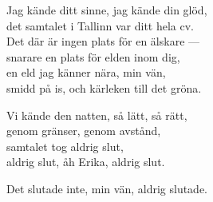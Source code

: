 \begin{lyrics}
Jag kände ditt sinne, jag kände din glöd,\\
det samtalet i Tallinn var ditt hela cv.\\
Det där är ingen plats för en älskare —\\
snarare en plats för elden inom dig,\\
en eld jag känner nära, min vän,\\
smidd på is, och kärleken till det gröna.

Vi kände den natten, så lätt, så rätt,\\
genom gränser, genom avstånd,\\
samtalet tog aldrig slut,\\
aldrig slut, åh Erika, aldrig slut.

Det slutade inte, min vän, aldrig slutade.
\end{lyrics}

